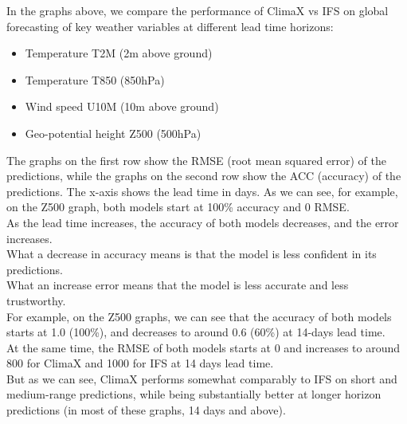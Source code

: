 \documentclass[../paper.tex]{subfiles}
\begin{document}
            In the graphs above,
            we compare the performance of ClimaX vs IFS on global forecasting of key weather variables at different lead time horizons:
            \begin{itemize}
                \item Temperature T2M (2m above ground)
                \item Temperature T850 (850hPa)
                \item Wind speed U10M (10m above ground)
                \item Geo-potential height Z500 (500hPa)
            \end{itemize}
            The graphs on the first row show the RMSE (root mean squared error) of the predictions,
            while the graphs on the second row show the ACC (accuracy) of the predictions.
            The x-axis shows the lead time in days.
            As we can see, for example, on the Z500 graph, both models start at 100\% accuracy and 0 RMSE.\\
            As the lead time increases, the accuracy of both models decreases, and the error increases.\\
            What a decrease in accuracy means is that the model is less confident in its predictions.\\
            What an increase error means that the model is less accurate and less trustworthy.\\
            For example, on the Z500 graphs, we can see that the accuracy of both models starts at 1.0 (100\%),
            and decreases to around 0.6 (60\%) at 14-days lead time.\\
            At the same time,
            the RMSE of both models starts at 0
            and increases to around 800 for ClimaX and 1000 for IFS at 14 days lead time.
            \\
            But as we can see, ClimaX performs somewhat comparably to IFS on short and medium-range predictions,
            while being substantially better at longer horizon predictions (in most of these graphs, 14 days and above).\\
\end{document}
